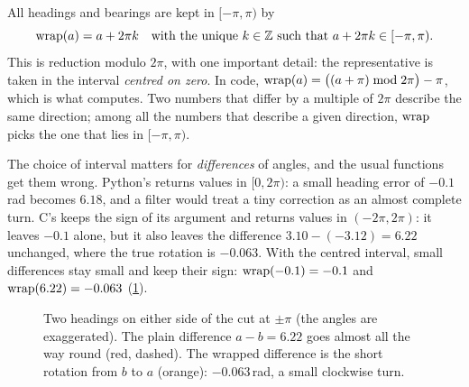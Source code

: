 All headings and bearings are kept in
$[-\pi,\pi)$ by
\[
  \operatorname{wrap}(a)=a+2\pi k\quad\text{with the unique }k\in\mathbb{Z}\text{ such
  that }a+2\pi k\in[-\pi,\pi).
\]
This is reduction modulo $2\pi$, with one important detail: the
representative is taken in the interval \emph{centred on zero}. In code,
$\operatorname{wrap}(a)=\bigl((a+\pi)\bmod2\pi\bigr)-\pi$, which is what
 computes. Two numbers that differ by a multiple of
$2\pi$ describe the same direction; among all the numbers that describe a
given direction, $\operatorname{wrap}$ picks the one that lies in $[-\pi,\pi)$.

The choice of interval matters for \emph{differences} of angles, and the
usual  functions get them wrong. Python's \code{\%} returns
values in $[0,2\pi)$: a small heading error of $-0.1$\,rad becomes $6.18$,
and a filter would treat a tiny correction as an almost complete turn. C's
 keeps the sign of its argument and returns values in
$(-2\pi,2\pi)$: it leaves $-0.1$ alone, but it also leaves the difference
$3.10-(-3.12)=6.22$ unchanged, where the true rotation is $-0.063$. With
the centred interval, small differences stay small and keep their sign:
$\operatorname{wrap}(-0.1)=-0.1$ and $\operatorname{wrap}(6.22)=-0.063$ (\cref{fig:wrap}).

\begin{figure}[ht]
\centering
{}
\caption{Two headings on either side of the cut at $\pm\pi$ (the angles
are exaggerated). The plain difference $a-b=6.22$ goes almost all the way
round (red, dashed). The wrapped difference is the short rotation from
$b$ to $a$ (orange): $-0.063$\,rad, a small clockwise turn.}
\label{fig:wrap}
\end{figure}

